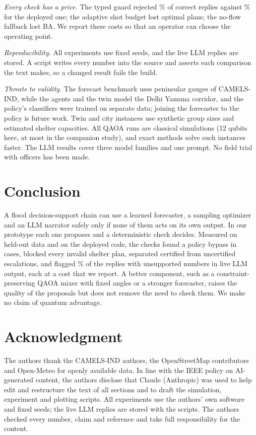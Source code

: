 \documentclass[conference]{IEEEtran}
\begin{document}
\textit{Every check has a price.} The typed guard rejected \AgLiveTypFpr\% of correct replies against \AgLiveDepFpr\% for the deployed one; the adaptive shot budget lost optimal plans; the no-flow fallback lost BA. We report these costs so that an operator can choose the operating point.

\textit{Reproducibility.} All experiments use fixed seeds, and the live LLM replies are stored. A script writes every number into the source and asserts each comparison the text makes, so a changed result fails the build.

\textit{Threats to validity.} The forecast benchmark uses peninsular gauges of CAMELS-IND, while the agents and the twin model the Delhi Yamuna corridor, and the policy's classifiers were trained on separate data; joining the forecaster to the policy is future work. Twin and city instances use synthetic group sizes and estimated shelter capacities. All QAOA runs are classical simulations (12 qubits here, at most \QaScQubitsMax{} in the companion study), and exact methods solve such instances faster. The LLM results cover three model families and one prompt. No field trial with officers has been made.

\section{Conclusion}
A flood decision-support chain can use a learned forecaster, a sampling optimizer and an LLM narrator safely only if none of them acts on its own output. In our prototype each one proposes and a deterministic check decides. Measured on held-out data and on the deployed code, the checks found a policy bypass in \AgEtoEViolBefore{} cases, blocked every invalid shelter plan, separated certified from uncertified escalations, and flagged \AgLiveTypRec\% of the replies with unsupported numbers in live LLM output, each at a cost that we report. A better component, such as a constraint-preserving QAOA mixer with fixed angles or a stronger forecaster, raises the quality of the proposals but does not remove the need to check them. We make no claim of quantum advantage.

\section*{Acknowledgment}
The authors thank the CAMELS-IND authors, the OpenStreetMap contributors and Open-Meteo for openly available data.
In line with the IEEE policy on AI-generated content, the authors disclose that Claude (Anthropic) was used to help edit and restructure the text of all sections and to draft the simulation, experiment and plotting scripts. All experiments use the authors' own software and fixed seeds; the live LLM replies are stored with the scripts. The authors checked every number, claim and reference and take full responsibility for the content.
\end{document}
